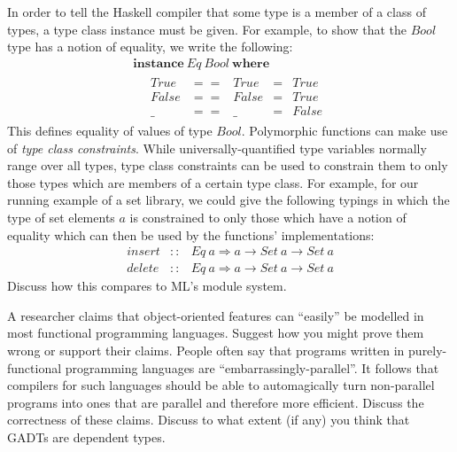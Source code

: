 \documentclass{supervision}
\begin{document}
\begin{questions}
\begin{parts}
In order to tell the Haskell compiler that some type is a member of a class of types, a type class instance must be given. For example, to show that the $\mathit{Bool}$ type has a notion of equality, we write the following:
\begin{displaymath}
\begin{array}{l}
\mathbf{instance}~\mathit{Eq}~\mathit{Bool}~\mathbf{where} \\
\quad \begin{array}{lclcl}
\mathit{True} & == & \mathit{True} & = & \mathit{True} \\
\mathit{False} & == & \mathit{False} & = & \mathit{True} \\
\_ & == & \_ & = & \mathit{False}
\end{array}
\end{array}
\end{displaymath}
This defines equality of values of type $\mathit{Bool}$. Polymorphic functions can make use of \emph{type class constraints}. While universally-quantified type variables normally range over all types, type class constraints can be used to constrain them to only those types which are members of a certain type class. For example, for our running example of a set library, we could give the following typings in which the type of set elements $a$ is constrained to only those which have a notion of equality which can then be used by the functions' implementations:
\begin{displaymath}
\begin{array}{lcl}
\mathit{insert} & :: & \mathit{Eq}~a \Rightarrow a \to \mathit{Set}~a \to \mathit{Set}~a \\
\mathit{delete} & :: & \mathit{Eq}~a \Rightarrow a \to \mathit{Set}~a \to \mathit{Set}~a
\end{array}
\end{displaymath}
Discuss how this compares to ML's module system.
\end{parts}
\question A researcher claims that object-oriented features can ``easily'' be modelled in most functional programming languages. Suggest how you might prove them wrong or support their claims.
\question People often say that programs written in purely-functional programming languages are ``embarrassingly-parallel''. It follows that compilers for such languages should be able to automagically turn non-parallel programs into ones that are parallel and therefore more efficient. Discuss the correctness of these claims.
\question Discuss to what extent (if any) you think that GADTs are dependent types.


\end{questions}
\end{document}
